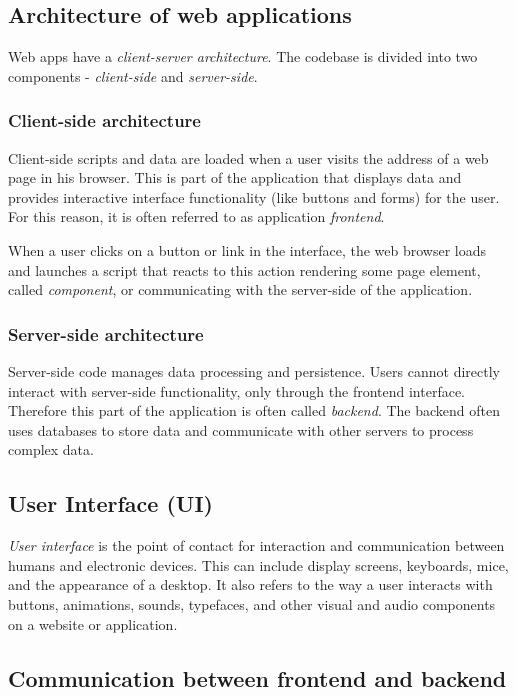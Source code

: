\subsection{Architecture of web applications}

Web apps have a \emph{client-server architecture}. The codebase is divided into two components - \emph{client-side} and \emph{server-side}.

\subsubsection{Client-side architecture}

Client-side scripts and data are loaded when a user visits the address of a web page in his browser. This is part of the application that displays data and provides interactive interface functionality (like buttons and forms) for the user. For this reason, it is often referred to as application \emph{frontend}.

When a user clicks on a button or link in the interface, the web browser loads and launches a script that reacts to this action rendering some page element, called \emph{component}, or communicating with the server-side of the application. 

\subsubsection{Server-side architecture}

Server-side code manages data processing and persistence. Users cannot directly interact with server-side functionality, only through the frontend interface. Therefore this part of the application is often called \emph{backend}. The backend often uses databases to store data and communicate with other servers to process complex data. \cite{aws_web_app}

\subsection{User Interface (UI)}

\emph{User interface} is the point of contact for interaction and communication between humans and electronic devices. This can include display screens, keyboards, mice, and the appearance of a desktop. It also refers to the way a user interacts with buttons, animations, sounds, typefaces, and other visual and audio components on a website or application. \cite{what_is_ui}

\subsection{Communication between frontend and backend}

